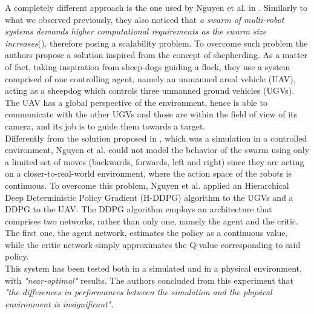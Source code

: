 \documentclass[conference]{IEEEtran}
\begin{document}
A completely different approach is the one used by Nguyen et al. in \cite{nguyen2020continuous}. Similarly to what we observed previously, they also noticed that \textit{a swarm of multi-robot systems demands higher computational requirements as the swarm size increases}(\cite{nguyen2020continuous}), therefore posing a scalability problem. To overcome such problem the authors propose a solution inspired from the concept of shepherding. As a matter of fact, taking inspiration from sheep-dogs guiding a flock, they use a system comprised of one controlling agent, namely an unmanned areal vehicle (UAV), acting as a sheepdog which controls three unmanned ground vehicles (UGVs). The UAV has a global perspective of the environment, hence is able to communicate with the other UGVs and those are within the field of view of its camera, and its job is to guide them towards a target. \\
Differently from the solution proposed in \cite{guided}, which was a simulation in a controlled environment, Nguyen et al. could not model the behavior of the swarm using only a limited set of moves (backwards, forwards, left and right) since they are acting on a closer-to-real-world environment, where the action space of the robots is continuous.
To overcome this problem,  Nguyen et al. applied an Hierarchical Deep Deterministic Policy Gradient (H-DDPG) algorithm to the UGVs and a DDPG to the UAV.
The DDPG algorithm employs an architecture that comprises two networks, rather than only one, namely the agent and the critic. The first one, the agent network, estimates the policy as a continuous value, while the critic network simply approximates the Q-value corresponding to said policy. \\
This system has been tested both in a simulated and in a physical environment, with \textit{"near-optimal"} results. The authors concluded from this experiment that \textit{"the differences in performances between the simulation and the physical environment is insignificant"}\cite{nguyen2020continuous}. \\
\end{document}
